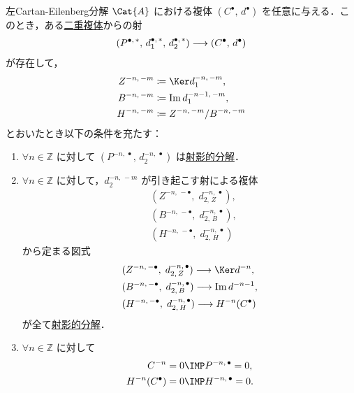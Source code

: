 \documentclass[algtopo_main]{subfiles}
\begin{document}
\begin{myprop}[label=prop:Cartan-Eilenberg-L, breakable]{左Cartan-Eilenberg分解}
    $\Cat{A}$ における複体 $(C^\bullet,\, d^\bullet)$ を任意に与える．このとき，ある\hyperref[def:double-complex]{二重複体}からの射
    \begin{align}
        (P^{\bullet,\, *},\, d_1^{\bullet,\, *},\, d_2^{\bullet,\, *}) \longrightarrow (C^\bullet,\, d^\bullet) \label{eq:CEresol-L}
    \end{align}
    が存在して，
    \begin{align}
        Z^{-n,\, -m} &\coloneqq \Ker d_1^{-n,\, -m}, \\
        B^{-n,\, -m} &\coloneqq \Im d_1^{-n-1,\, -m}, \\
        H^{-n,\, -m} &\coloneqq  Z^{-n,\, -m} /  B^{-n,\, -m}
    \end{align}
    とおいたとき以下の条件を充たす：
    \begin{enumerate}
        \item $\forall n \in \mathbb{Z}$ に対して $(P^{-n,\,\bullet},\, d_2^{-n,\, \bullet})$ は\hyperref[def:projective-resolution]{射影的分解}．
        \item $\forall n \in \mathbb{Z}$ に対して，$d_2^{-n,\, -m}$ が引き起こす射による複体
        \begin{align}
            &(Z^{-n,\, -\bullet},\; d_{2,\,Z}^{-n,\, \bullet}),\\
            &(B^{-n,\, -\bullet},\; d_{2,\,B}^{-n,\, \bullet}),\\ 
            &(H^{-n,\, -\bullet},\; d_{2,\,H}^{-n,\, \bullet})
        \end{align}
        から定まる図式
        \begin{align}
            &(Z^{-n,\, -\bullet},\; d_{2,\,Z}^{-n,\, \bullet}) \lto \Ker d^{-n},\\
            &(B^{-n,\, -\bullet},\; d_{2,\,B}^{-n,\, \bullet}) \lto \Im d^{-n-1},\\ 
            &(H^{-n,\, -\bullet},\; d_{2,\,H}^{-n,\, \bullet}) \lto H^{-n} (C^\bullet)
        \end{align}
        が全て\hyperref[def:projective-resolution]{射影的分解}．
        \item $\forall n \in \mathbb{Z}$ に対して
        \begin{align}
            C^{-n} = 0 &\IMP P^{-n,\, \bullet} = 0, \\
            H^{-n}(C^\bullet) = 0 &\IMP H^{-n,\, \bullet} = 0.
        \end{align}
    \end{enumerate}
\end{myprop}
\end{document}
